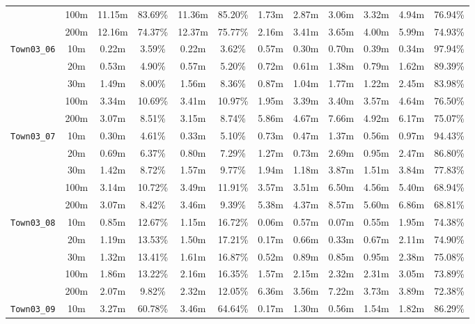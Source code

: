 \begin{table}
{\begin{tabular}{@{}cccccccccccc@{}}
      & 100m & 11.15m & 83.69\% & 11.36m & 85.20\% & 1.73m & 2.87m & 3.06m & 3.32m & 4.94m & 76.94\% \\
      & 200m & 12.16m & 74.37\% & 12.37m & 75.77\% & 2.16m & 3.41m & 3.65m & 4.00m & 5.99m & 74.93\% \\
      \midrule
      \multirow{5}{*}{\Verb|Town03_06|} & 10m & 0.22m & 3.59\% & 0.22m & 3.62\% & 0.57m & 0.30m & 0.70m & 0.39m & 0.34m & 97.94\% \\
      & 20m & 0.53m & 4.90\% & 0.57m & 5.20\% & 0.72m & 0.61m & 1.38m & 0.79m & 1.62m & 89.39\% \\
      & 30m & 1.49m & 8.00\% & 1.56m & 8.36\% & 0.87m & 1.04m & 1.77m & 1.22m & 2.45m & 83.98\% \\
      & 100m & 3.34m & 10.69\% & 3.41m & 10.97\% & 1.95m & 3.39m & 3.40m & 3.57m & 4.64m & 76.50\% \\
      & 200m & 3.07m & 8.51\% & 3.15m & 8.74\% & 5.86m & 4.67m & 7.66m & 4.92m & 6.17m & 75.07\% \\
      \midrule
      \multirow{5}{*}{\Verb|Town03_07|} & 10m & 0.30m & 4.61\% & 0.33m & 5.10\% & 0.73m & 0.47m & 1.37m & 0.56m & 0.97m & 94.43\% \\
      & 20m & 0.69m & 6.37\% & 0.80m & 7.29\% & 1.27m & 0.73m & 2.69m & 0.95m & 2.47m & 86.80\% \\
      & 30m & 1.42m & 8.72\% & 1.57m & 9.77\% & 1.94m & 1.18m & 3.87m & 1.51m & 3.84m & 77.83\% \\
      & 100m & 3.14m & 10.72\% & 3.49m & 11.91\% & 3.57m & 3.51m & 6.50m & 4.56m & 5.40m & 68.94\% \\
      & 200m & 3.07m & 8.42\% & 3.46m & 9.39\% & 5.38m & 4.37m & 8.57m & 5.60m & 6.86m & 68.81\% \\
      \midrule
      \multirow{5}{*}{\Verb|Town03_08|} & 10m & 0.85m & 12.67\% & 1.15m & 16.72\% & 0.06m & 0.57m & 0.07m & 0.55m & 1.95m & 74.38\% \\
      & 20m & 1.19m & 13.53\% & 1.50m & 17.21\% & 0.17m & 0.66m & 0.33m & 0.67m & 2.11m & 74.90\% \\
      & 30m & 1.32m & 13.41\% & 1.61m & 16.87\% & 0.52m & 0.89m & 0.85m & 0.95m & 2.38m & 75.08\% \\
      & 100m & 1.86m & 13.22\% & 2.16m & 16.35\% & 1.57m & 2.15m & 2.32m & 2.31m & 3.05m & 73.89\% \\
      & 200m & 2.07m & 9.82\% & 2.32m & 12.05\% & 6.36m & 3.56m & 7.22m & 3.73m & 3.89m & 72.38\% \\
      \midrule
      \multirow{5}{*}{\Verb|Town03_09|} & 10m & 3.27m & 60.78\% & 3.46m & 64.64\% & 0.17m & 1.30m & 0.56m & 1.54m & 1.82m & 86.29\% \\

\end{tabular}}
\end{table}
